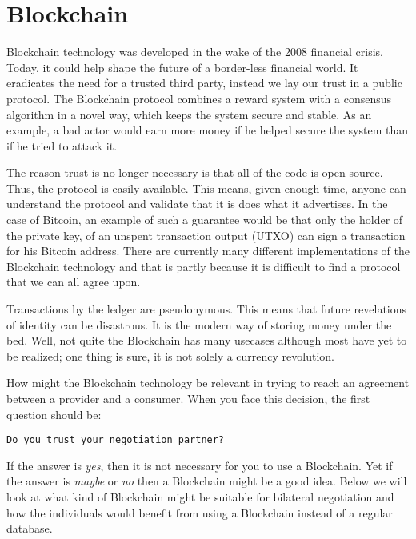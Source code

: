 \chapter{Blockchain}

Blockchain technology was developed in the wake of the 2008 financial crisis. Today, it could help shape the future of a border-less financial world. It eradicates the need for a trusted third party, instead we lay our trust in a public protocol. The Blockchain protocol combines a reward system with a consensus algorithm in a novel way, which keeps the system secure and stable. As an example, a bad actor would earn more money if he helped secure the system than if he tried to attack it.

The reason trust is no longer necessary is that all of the code is open source. Thus, the protocol is easily available. This means, given enough time, anyone can understand the protocol and validate that it is does what it advertises. In the case of Bitcoin, an example of such a guarantee would be that only the holder of the private key, of an unspent transaction output (UTXO) can sign a transaction for his Bitcoin address. There are currently many different implementations of the Blockchain technology and that is partly because it is difficult to find a protocol that we can all agree upon.

Transactions by the ledger are pseudonymous. This means that future revelations of identity can be disastrous. It is the modern way of storing money under the bed. Well, not quite the Blockchain has many usecases although most have yet to be realized; one thing is sure, it is not solely a currency revolution.

How might the Blockchain technology be relevant in trying to reach an agreement between a provider and a consumer. When you face this decision, the first question should be:
\begin{verbatim}
Do you trust your negotiation partner? 
\end{verbatim}
If the answer is \emph{yes}, then it is not necessary for you to use a Blockchain. Yet if the answer is \emph{maybe} or \emph{no} then a Blockchain might be a good idea. Below we will look at what kind of Blockchain might be suitable for bilateral negotiation and how the individuals would benefit from using a Blockchain instead of a regular database.


